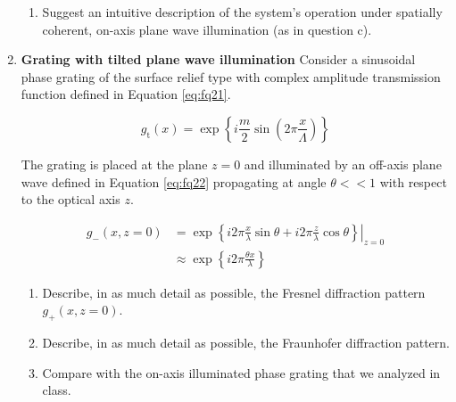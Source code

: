 \documentclass[main.tex]{subfiles}
\begin{document}
\begin{enumerate}
\begin{enumerate}
\item{Suggest an intuitive description of the system's operation under spatially coherent, on-axis plane wave illumination (as in question c)}.

\end{enumerate}

\item{\textbf{Grating with tilted plane wave illumination} Consider a sinusoidal phase grating of the surface relief type with complex amplitude transmission function defined in Equation \ref{eq:fq21}}.

\begin{equation}\label{eq:fq21}
g_{\mathrm{t}}(x)=\exp \left\{i \frac{m}{2} \sin \left(2 \pi \frac{x}{\Lambda}\right)\right\}
\end{equation}

The grating is placed at the plane $z=0$ and illuminated by an off-axis plane wave defined in Equation \ref{eq:fq22} propagating at angle $\theta << 1$ with respect to the optical axis $z$.

\begin{equation}\label{eq:fq22}
\begin{aligned} 
g_{-}(x, z=0)&=\left.\exp \left\{i 2 \pi \frac{x}{\lambda} \sin \theta+i 2 \pi \frac{z}{\lambda} \cos \theta\right\}\right|_{z=0} \\
&\approx \exp \left\{i 2 \pi \frac{\theta x}{\lambda}\right\}
\end{aligned} 
\end{equation}

\begin{enumerate}
\item{Describe, in as much detail as possible, the Fresnel diffraction pattern $g_+(x,z=0)$.}

\item{Describe, in as much detail as possible, the Fraunhofer diffraction pattern.}

\item{Compare with the on-axis illuminated phase grating that we analyzed in class.}


\end{enumerate}
\end{enumerate}
\end{document}
